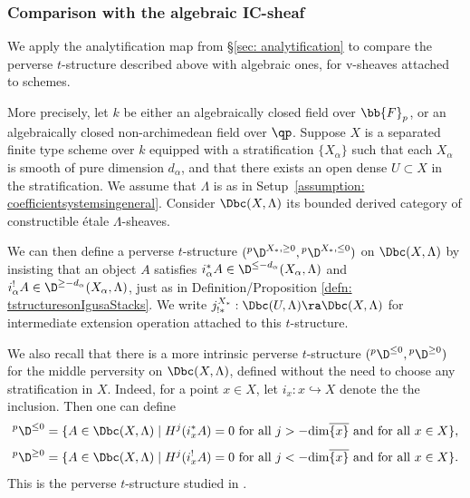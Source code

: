 \documentclass[letterpaper,11pt]{amsart}
\begin{document}
\subsubsection{Comparison with the algebraic IC-sheaf}{\label{ss: ComparisonWithAlgebraicIC}}

We apply the analytification map from \S \ref{sec: analytification} to compare the perverse $t$-structure described above with algebraic ones, for v-sheaves attached to schemes. 

More precisely, let $k$ be either an algebraically closed field over $\bb{F}_p$, or an algebraically closed non-archimedean field over $\qp$. Suppose $X$ is a separated finite type scheme over $k$ equipped with a stratification $\{X_{\alpha}\}$ such that each $X_{\alpha}$ is smooth of pure dimension $d_{\alpha}$, and that there exists an open dense $U \subset X$ in the stratification. We assume that $\Lambda$ is as in Setup~\ref{assumption: coefficientsystemsingeneral}. 
Consider $\Dbc(X,\Lambda)$ its bounded derived category of constructible \'etale $\Lambda$-sheaves.

We can then define a perverse $t$-structure $(\phantom{}^{p}\D^{X_\ast, \geq 0}, \phantom{}^{p}\D^{X_\ast, \leq 0})$ on $\Dbc(X,\Lambda)$ by insisting that an object $A$ satisfies $i_\alpha^\ast A \in \D^{\leq -d_{\alpha}}(X_\alpha,\Lambda)$ and $i_\alpha^{!}A \in \D^{\geq -d_\alpha}(X_\alpha,\Lambda)$, just as in Definition/Proposition \ref{defn: tstructuresonIgusaStacks}. We write $j^{X_\ast}_{!*}: \Dbc(U,\Lambda) \ra \Dbc(X,\Lambda)$ for intermediate extension operation attached to this $t$-structure. 

We also recall that there is a more intrinsic perverse $t$-structure $(\phantom{}^{p}\D^{\leq 0},\phantom{}^{p}\D^{\geq 0})$ for the middle perversity on $\Dbc(X,\Lambda)$, defined without the need to choose any stratification in $X$. Indeed, for a point $x\in X$, let $i_x:x\hookrightarrow X$ denote the  the inclusion. Then one can define  
\[
\phantom{}^{p}\D^{\leq 0} = \{A\in \Dbc(X,\Lambda)\mid H^j(i_x^*A) = 0\text{ for all }j>-\mathrm{dim}\overline{\{x\}}\text{ and for all }x\in X \},
\]
\[
\phantom{}^{p}\D^{\geq 0} = \{A\in \Dbc(X,\Lambda)\mid H^j(i_x^{!}A) = 0\text{ for all }j<-\mathrm{dim}\overline{\{x\}}\text{ and for all }x\in X \}. 
\]
This is the perverse $t$-structure studied in \cite[\S 2.2]{BBD}.
\end{document}
